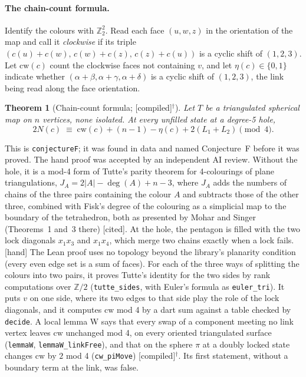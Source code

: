 \documentclass[11pt]{article}
\newtheorem{theorem}{Theorem}\newtheorem{lemma}{Lemma}\newtheorem{conjecture}{Conjecture}
\newcommand{\lab}[1]{\textsf{[#1]}}
\begin{document}
\paragraph{The chain-count formula.} Identify the colours with $\mathbb Z_2^2$. Read each face $(u,w,z)$ in the orientation of the map and call it \emph{clockwise} if its triple $(c(u){+}c(w),\,c(w){+}c(z),\,c(z){+}c(u))$ is a cyclic shift of $(1,2,3)$. Let $\mathrm{cw}(c)$ count the clockwise faces not containing $v$, and let $\eta(c)\in\{0,1\}$ indicate whether $(\alpha{+}\beta,\alpha{+}\gamma,\alpha{+}\delta)$ is a cyclic shift of $(1,2,3)$, the link being read along the face orientation.
\begin{theorem}[Chain-count formula; \lab{compiled}$^\dagger$]\label{thm:F}
Let $T$ be a triangulated spherical map on $n$ vertices, none isolated. At every unfilled state at a degree-5 hole,
\[2N(c)\;\equiv\;\mathrm{cw}(c)+(n-1)-\eta(c)+2(L_1+L_2)\pmod 4.\]
\end{theorem}
This is \texttt{conjectureF}; it was found in data and named Conjecture~F before it was proved. The hand proof was accepted by an independent AI review. Without the hole, it is a mod-4 form of Tutte's parity theorem for 4-colourings of plane triangulations, $J_A=2|A|-\deg(A)+n-3$, where $J_A$ adds the numbers of chains of the three pairs containing the colour $A$ and subtracts those of the other three, combined with Fisk's degree of the colouring as a simplicial map to the boundary of the tetrahedron, both as presented by Mohar and Singer~\cite{mohar2019} (Theorems~1 and~3 there) \lab{cited}. At the hole, the pentagon is filled with the two lock diagonals $x_1x_3$ and $x_1x_4$, which merge two chains exactly when a lock fails. \lab{hand} The Lean proof uses no topology beyond the library's planarity condition (every even edge set is a sum of faces). For each of the three ways of splitting the colours into two pairs, it proves Tutte's identity for the two sides by rank computations over $\mathbb Z/2$ (\texttt{tutte\_sides}, with Euler's formula as \texttt{euler\_tri}). It puts $v$ on one side, where its two edges to that side play the role of the lock diagonals, and it computes $\mathrm{cw}$ mod 4 by a dart sum against a table checked by \texttt{decide}. A local lemma W says that every swap of a component meeting no link vertex leaves $\mathrm{cw}$ unchanged mod 4, on every oriented triangulated surface (\texttt{lemmaW}, \texttt{lemmaW\_linkFree}), and that on the sphere $\pi$ at a doubly locked state changes $\mathrm{cw}$ by $2$ mod 4 (\texttt{cw\_piMove}) \lab{compiled}$^\dagger$. Its first statement, without a boundary term at the link, was false.
\end{document}
